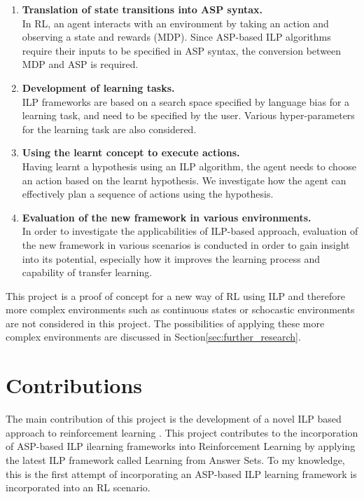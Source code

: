 \newcommand\litem[1]{\item{\bfseries #1.\\}}
\begin{enumerate}
\litem{Translation of state transitions into ASP syntax} 
In RL, an agent interacts with an environment by taking an action and observing a state and rewards (MDP). 
Since ASP-based ILP algorithms require their inputs to be specified in ASP syntax, the conversion between MDP and ASP is required.
\litem{Development of learning tasks} ILP frameworks are based on a search space specified by language bias for a learning task, and need to be specified by the user. 
Various hyper-parameters for the learning task are also considered.
\litem{Using the learnt concept to execute actions}
Having learnt a hypothesis using an ILP algorithm, the agent needs to choose an action based on the learnt hypothesis.
We investigate how the agent can effectively plan a sequence of actions using the hypothesis.
\litem{Evaluation of the new framework in various environments}
In order to investigate the applicabilities of ILP-based approach, evaluation of the new framework in various scenarios is conducted in order to gain
insight into its potential, especially how it improves the learning process and capability of transfer learning.
\end{enumerate}

This project is a proof of concept for a new way of RL using ILP and therefore more complex environments such as continuous states or schocastic environments are not considered in this project. 
The possibilities of applying these more complex environments are discussed in Section\ref{sec:further_research}.

\section{Contributions}
\label{contributions}
The main contribution of this project is the development of a novel ILP based approach to reinforcement learning .
This project contributes to the incorporation of ASP-based ILP ilearning frameworks into Reinforcement Learning by applying the latest ILP framework called Learning from Answer Sets. 
To my knowledge, this is the first attempt of incorporating an ASP-based ILP learning framework is incorporated into an RL scenario.

